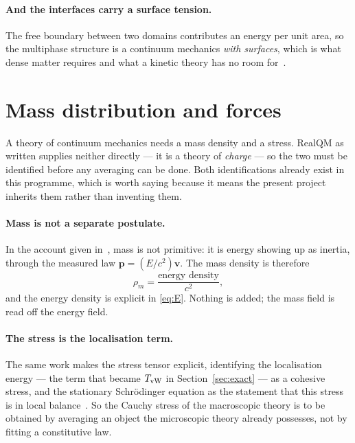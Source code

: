 \documentclass[11pt]{article}
\begin{document}
\paragraph{And the interfaces carry a surface tension.} The free boundary between two domains
contributes an energy per unit area, so the multiphase structure is a continuum mechanics
\emph{with surfaces}, which is what dense matter requires and what a kinetic theory has no room
for~\cite{madelung}.

\section{Mass distribution and forces}\label{sec:mass}

A theory of continuum mechanics needs a mass density and a stress. RealQM as written supplies
neither directly --- it is a theory of \emph{charge} --- so the two must be identified before any
averaging can be done. Both identifications already exist in this programme, which is worth saying
because it means the present project inherits them rather than inventing them.

\paragraph{Mass is not a separate postulate.} In the account given in~\cite{nomass}, mass is not
primitive: it is energy showing up as inertia, through the measured law $\mathbf p = (E/c^2)\mathbf
v$. The mass density is therefore
\begin{equation}\label{eq:rhom}
\rho_m = \frac{\text{energy density}}{c^2} ,
\end{equation}
and the energy density is explicit in \eqref{eq:E}. Nothing is added; the mass field is read off the
energy field.

\paragraph{The stress is the localisation term.} The same work makes the stress tensor
explicit, identifying the localisation energy --- the term that became $T_{\rm vW}$ in
Section~\ref{sec:exact} --- as a cohesive stress, and the stationary Schr\"odinger equation as the
statement that this stress is in local balance~\cite{nomass}. So the Cauchy stress of the
macroscopic theory is to be obtained by averaging an object the microscopic theory already
possesses, not by fitting a constitutive law.
\end{document}

